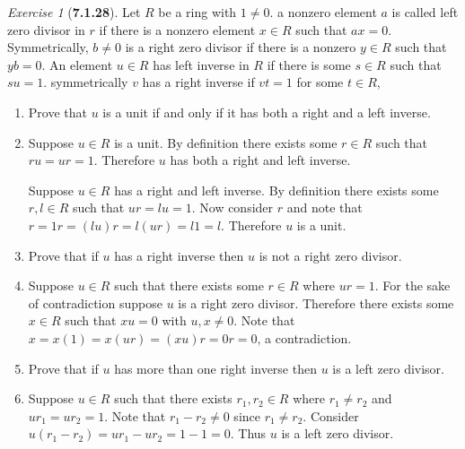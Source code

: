 \documentclass[12pt]{amsart}
\makeatletter
\theoremstyle{remark}
\newtheorem*{exercise}{Exercise}%
\renewenvironment{proof}[1][\proofname]{\par\doublespacing
  \pushQED{\qed}%
  \normalfont \topsep6\p@\@plus6\p@\relax
  \list{}{%
    \settowidth{\leftmargin}{\itshape\proofname:\hskip\labelsep}%
    \setlength{\labelwidth}{0pt}%
    \setlength{\itemindent}{-\leftmargin}%
  }%
  \item[\hskip\labelsep\itshape#1\@addpunct{:}]\ignorespaces
}{%
  \popQED\endlist\@endpefalse
  \singlespacing
}
\theoremstyle{mycomment}
\makeatother
\begin{document}
\begin{exercise}[\textbf{7.1.28}] Let $R$ be a ring with $1 \neq 0$. a nonzero element $a$ is called left zero divisor in $r$
  if there is a nonzero element $x \in R$ such that $ax = 0$. Symmetrically, $b \neq 0$ is a right zero divisor if there is a nonzero
  $y \in R$ such that $yb = 0$. An element $u \in R$ has left inverse in $R$ if there is some $s \in R$ such that $su = 1$. symmetrically $v$ has 
  a right inverse if $vt = 1$ for some $t \in R$, 
  \begin{enumerate}
    \item[(a)] Prove that $u$ is a unit if and only if it has both a right and a left inverse. 
    \begin{proof} Suppose $u \in R$ is a unit. By definition there exists some $r \in R$ such that $ru = ur = 1$. Therefore 
      $u$ has both a right and left inverse. 

      Suppose $u \in R$ has a right and left inverse. By definition there exists some $r, l \in R$ such that $ur = lu = 1$. 
      Now consider $r$ and note that $r = 1r = (lu)r  = l(ur) = l1 = l$. Therefore $u$ is a unit. 

    \end{proof}
    \vspace{.15in}


    \item[(b)] Prove that if $u$ has a right inverse then $u$ is not a right zero divisor. 
      \begin{proof} Suppose $u \in R$ such that there exists some $r\in R$ where $ur = 1$. For the sake of contradiction suppose 
        $u$ is a right zero divisor. Therefore there exists some $x \in R$ such that $xu = 0$ with $u, x \neq 0$. 
        Note that $x = x(1) = x(ur) = (xu)r = 0r = 0$, a contradiction.  
    \end{proof}
    \vspace{.15in}


    \item[(c)] Prove that if $u$ has more than one right inverse then $u$ is a left zero divisor. 
    \begin{proof} Suppose $u \in R$ such that there exists $r_1, r_2 \in R$ where $r_1 \neq r_2$ and $ur_1 = ur_2 = 1$. Note 
      that $r_1 - r_2 \neq 0$ since $r_1 \neq r_2$. Consider $u(r_1 - r_2) = ur_1 - ur_2 = 1 - 1 = 0$. Thus $u$ is a left zero divisor.  
    \end{proof}
    \vspace{.15in}



\end{enumerate}
\end{exercise}
\end{document}
